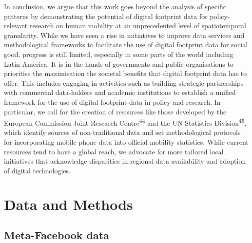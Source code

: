 \documentclass[
  11pt,
]{article}
\begin{document}
In conclusion, we argue that this work goes beyond the analysis of
specific patterns by demonstrating the potential of digital footprint
data for policy-relevant research on human mobility at an unprecedented
level of spatiotemporal granularity. While we have seen a rise in
initiatives to improve data services and methodological frameworks to
facilitate the use of digital footprint data for social good, progress
is still limited, especially in some parts of the world including Latin
America. It is in the hands of governments and public organisations to
prioritise the maximisation the societal benefits that digital footprint
data has to offer. This includes engaging in activities such as building
strategic partnerships with commercial data-holders and academic
institutions to establish a unified framework for the use of digital
footprint data in policy and research. In particular, we call for the
creation of resources like those developed by the European Commission
Joint Research Centre\textsuperscript{44} and the UN Statistics
Division\textsuperscript{45}, which identify sources of non-traditional
data and set methodological protocols for incorporating mobile phone
data into official mobility statistics. While current resources tend to
have a global reach, we advocate for more tailored local initiatives
that acknowledge disparities in regional data availability and adoption
of digital technologies.

\section{Data and Methods}\label{sec-methods}

\subsection{Meta-Facebook data}\label{meta-facebook-data}
\end{document}
